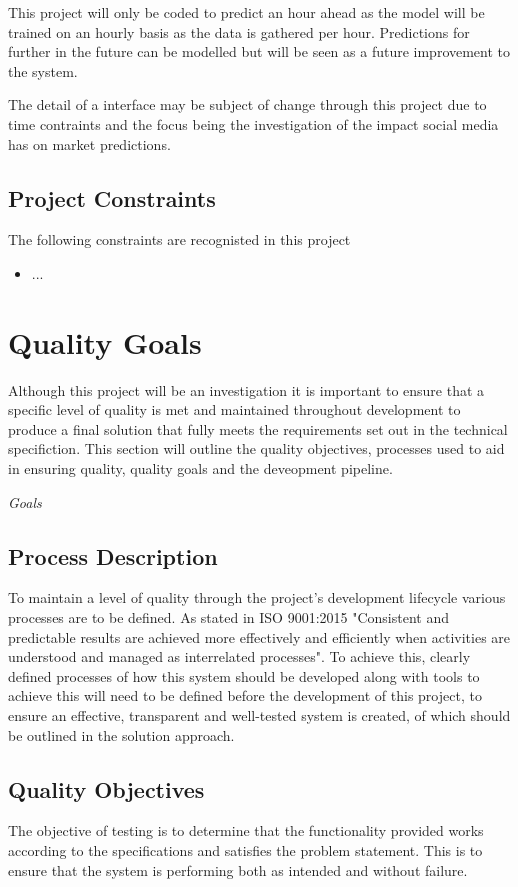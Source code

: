 \documentclass[oneside, 12pt]{article}
\begin{document}
		This project will only be coded to predict an hour ahead as the model will be trained on an hourly basis as the data is gathered per hour. Predictions for further in the future can be modelled but will be seen as a future improvement to the system.
		
		The detail of a interface may be subject of change through this project due to time contraints and the focus being the investigation of the impact social media has on market predictions.
		
		\subsection{Project Constraints}\label{constraints}
		The following constraints are recognisted in this project
		
		\begin{itemize}
			\item ...
		\end{itemize}
	
	\newpage
	\section{Quality Goals}
	Although this project will be an investigation it is important to ensure that a specific level of quality is met and maintained throughout development to produce a final solution that fully meets the requirements set out in the technical specifiction. This section will outline the quality objectives, processes used to aid in ensuring quality, quality goals and the deveopment pipeline.
	
	\textit{Goals}
	
	\subsection{Process Description}
	To maintain a level of quality through the project's development lifecycle various processes are to be defined. As stated in ISO 9001:2015 \cite{ISO9000} "Consistent and predictable results are achieved more effectively and efficiently when activities are understood and managed as interrelated processes". To achieve this, clearly defined processes of how this system should be developed along with tools to achieve this will need to be defined before the development of this project, to ensure an effective, transparent and well-tested system is created, of which should be outlined in the solution approach.
	
	\subsection{Quality Objectives}
	The objective of testing is to determine that the functionality provided works according to the specifications and satisfies the problem statement. This is to ensure that the system is performing both as intended and without failure.
	
\end{document}
